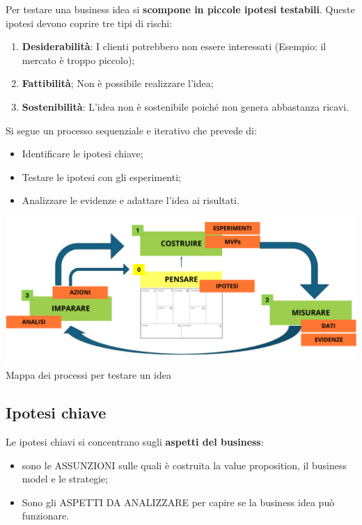 \documentclass[14pt]{extarticle}
\begin{document}
Per testare una business idea si \textbf{scompone in piccole ipotesi testabili}.
Queste ipotesi devono coprire tre tipi di rischi:

\begin{enumerate}
    \item \textbf{Desiderabilità}: I clienti potrebbero non essere interessati
    (Esempio: il mercato è troppo piccolo);
    \item \textbf{Fattibilità}; Non è possibile realizzare l'idea;
    \item \textbf{Sostenibilità}: L'idea non è sostenibile poiché non genera
    abbastanza ricavi.  
\end{enumerate}

Si segue un processo sequenziale e iterativo che prevede di:

\begin{itemize}
    \item Identificare le ipotesi chiave;
    \item Testare le ipotesi con gli esperimenti;
    \item Analizzare le evidenze e adattare l'idea ai risultati.
\end{itemize}

\begin{center}
    \includegraphics[scale=0.45]{images/testare.png}
    Mappa dei processi per testare un idea
\end{center}

\subsection{Ipotesi chiave}

Le ipotesi chiavi si concentrano sugli \textbf{aspetti del business}:

\begin{itemize}
    \item sono le ASSUNZIONI sulle quali è costruita la value proposition, il
    business model e le strategie;
    \item Sono gli ASPETTI DA ANALIZZARE per capire se la business idea può
    funzionare.
\end{itemize}
\end{document}
